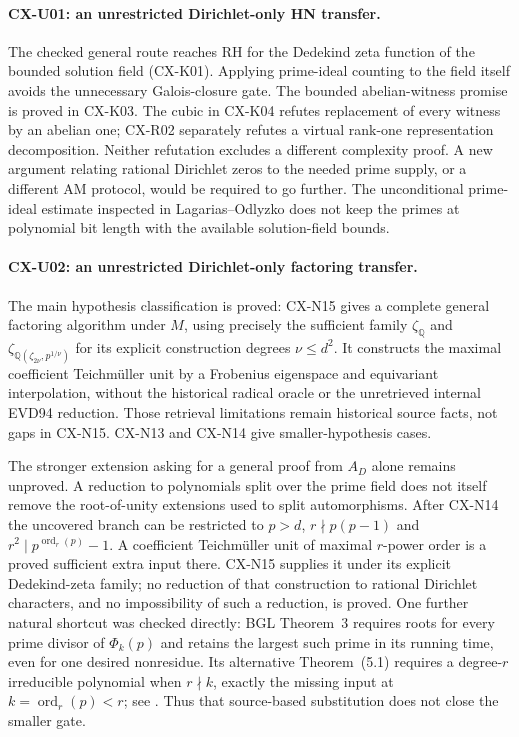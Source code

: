 \documentclass[11pt,a4paper]{article}
\begin{document}
\paragraph{CX-U01: an unrestricted Dirichlet-only HN transfer.}
The checked general route reaches RH for the Dedekind zeta function of
the bounded solution field (CX-K01). Applying prime-ideal counting to
the field itself avoids the unnecessary Galois-closure gate.
The bounded abelian-witness promise is proved in CX-K03.
The cubic in CX-K04 refutes replacement of every witness by an abelian
one; CX-R02 separately refutes a virtual rank-one representation
decomposition. Neither refutation excludes a different complexity
proof. A new argument relating rational Dirichlet zeros to the needed
prime supply, or a different AM protocol, would be required to go
further. The unconditional prime-ideal estimate inspected in
Lagarias--Odlyzko does not keep the primes at polynomial bit length
with the available solution-field bounds.

\paragraph{CX-U02: an unrestricted Dirichlet-only factoring transfer.}
The main hypothesis classification is proved: CX-N15 gives a complete
general factoring algorithm under $M$, using precisely the sufficient
family $\zeta_{\mathbb Q}$ and
$\zeta_{\mathbb Q(\zeta_{2\nu},p^{1/\nu})}$ for its explicit construction
degrees $\nu\le d^2$. It constructs the maximal coefficient Teichmüller
unit by a Frobenius eigenspace and equivariant interpolation, without
the historical radical oracle or the unretrieved internal EVD94 reduction.
Those retrieval limitations remain historical source facts, not gaps in
CX-N15. CX-N13 and CX-N14 give smaller-hypothesis cases.

The stronger extension asking for a general proof from $A_D$ alone
remains unproved. A reduction to polynomials split over the prime field
does not itself remove the root-of-unity extensions used to split
automorphisms. After CX-N14 the uncovered branch can be restricted to
$p>d$, $r\nmid p(p-1)$ and
$r^2\mid p^{\operatorname{ord}_r(p)}-1$.
A coefficient Teichmüller unit of maximal $r$-power order is a proved
sufficient extra input there. CX-N15 supplies it under its explicit
Dedekind-zeta family; no reduction of that construction to rational
Dirichlet characters, and no impossibility of such a reduction, is proved.
One further natural shortcut was checked directly: BGL Theorem~3
requires roots for every prime divisor of $\Phi_k(p)$ and retains the
largest such prime in its running time, even for one desired nonresidue.
Its alternative Theorem~(5.1) requires a degree-$r$ irreducible polynomial
when $r\nmid k$, exactly the missing input at $k=\operatorname{ord}_r(p)<r$;
see \cite[\S5, p.~20 and algorithm pp.~20--24]{CXNBGL01}.
Thus that source-based substitution does not close the smaller gate.
\end{document}
